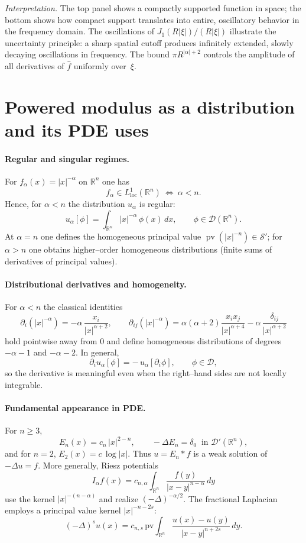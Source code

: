 \documentclass[12pt,a4paper]{article}
\theoremstyle{plain}
\theoremstyle{definition}
\theoremstyle{remark}
\theoremstyle{remark}
\begin{document}
\medskip

\noindent\textit{Interpretation.} 
The top panel shows a compactly supported function in space; the bottom shows how compact support translates into entire,
oscillatory behavior in the frequency domain.  
The oscillations of $J_1(R|\xi|)/(R|\xi|)$ illustrate the uncertainty principle:
a sharp spatial cutoff produces infinitely extended, slowly decaying oscillations in frequency.  
The bound $\pi R^{|\alpha|+2}$ controls the amplitude of all derivatives of $\widehat f$ uniformly over~$\xi$.

\clearpage


\section*{Powered modulus as a distribution and its PDE uses}

\paragraph{Regular and singular regimes.}
For $f_\alpha(x)=|x|^{-\alpha}$ on $\mathbb{R}^n$ one has
\[
f_\alpha\in L^1_{\mathrm{loc}}(\mathbb{R}^n)\ \iff\ \alpha<n.
\]
Hence, for $\alpha<n$ the distribution $u_\alpha$ is regular:
\[
u_\alpha[\phi]=\int_{\mathbb{R}^n}|x|^{-\alpha}\,\phi(x)\,dx,\qquad \phi\in\mathcal{D}(\mathbb{R}^n).
\]
At $\alpha=n$ one defines the homogeneous principal value $\operatorname{pv}(|x|^{-n})\in\mathcal{S}'$;
for $\alpha>n$ one obtains higher–order homogeneous distributions (finite sums of derivatives of principal values).

\bigskip

\paragraph{Distributional derivatives and homogeneity.}
For $\alpha<n$ the classical identities
\[
\partial_i(|x|^{-\alpha})=-\alpha\,\frac{x_i}{|x|^{\alpha+2}},\qquad
\partial_{ij}(|x|^{-\alpha})=\alpha(\alpha+2)\frac{x_i x_j}{|x|^{\alpha+4}}
-\alpha\,\frac{\delta_{ij}}{|x|^{\alpha+2}}
\]
hold pointwise away from $0$ and define homogeneous distributions of degrees $-\alpha-1$ and $-\alpha-2$.
In general,
\[
\partial_i u_\alpha[\phi] = -\,u_\alpha[\partial_i\phi],\qquad \phi\in\mathcal{D},
\]
so the derivative is meaningful even when the right–hand sides are not locally integrable.

\bigskip

\paragraph{Fundamental appearance in PDE.}
For $n\ge3$,
\[
E_n(x)=c_n\,|x|^{2-n},\qquad -\Delta E_n=\delta_0 \ \text{ in } \mathcal{D}'(\mathbb{R}^n),
\]
and for $n=2$, $E_2(x)=c\,\log|x|$.
Thus $u=E_n*f$ is a weak solution of $-\Delta u=f$.
More generally, Riesz potentials
\[
I_\alpha f(x)=c_{n,\alpha}\int_{\mathbb{R}^n}\frac{f(y)}{|x-y|^{n-\alpha}}\,dy
\]
use the kernel $|x|^{-(n-\alpha)}$ and realize $(-\Delta)^{-\alpha/2}$.
The fractional Laplacian employs a principal value kernel $|x|^{-n-2s}$:
\[
(-\Delta)^s u(x)=c_{n,s}\,\mathrm{pv}\!\int_{\mathbb{R}^n}\frac{u(x)-u(y)}{|x-y|^{n+2s}}\,dy .
\]
\end{document}

